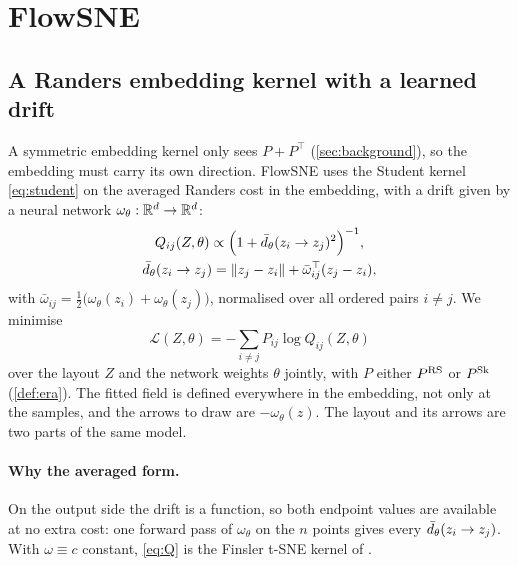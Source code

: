 \section{FlowSNE}
\label{sec:flowsne}

\subsection{A Randers embedding kernel with a learned drift}
\label{sec:kernel}

A symmetric embedding kernel only sees $P+P^\top$ (\cref{sec:background}),
so the embedding must carry its own direction. FlowSNE uses the Student
kernel \eqref{eq:student} on the averaged Randers cost in the embedding,
with a drift given by a neural network $\omega_\theta:\mathbb{R}^d\to\mathbb{R}^d$:
\begin{gather}
  Q_{ij}(Z,\theta)\propto\Big(1+\bar d_\theta(z_i\to z_j)^2\Big)^{-1},
  \label{eq:Q}\\
  \bar d_\theta(z_i\to z_j)=\|z_j-z_i\|+\bar\omega_{ij}^\top(z_j-z_i),
  \nonumber
\end{gather}
with $\bar\omega_{ij}=\tfrac12\big(\omega_\theta(z_i)+\omega_\theta(z_j)\big)$,
normalised over all ordered pairs $i\neq j$. We minimise
\begin{equation}
  \mathcal{L}(Z,\theta)=-\sum_{i\neq j}P_{ij}\log Q_{ij}(Z,\theta)
  \label{eq:loss}
\end{equation}
over the layout $Z$ and the network weights $\theta$ jointly, with $P$
either $P^{\operatorname{RS}}$ or $P^{\operatorname{Sk}}$ (\cref{def:era}). The fitted field is
defined everywhere in the embedding, not only at the samples, and the
arrows to draw are $-\omega_\theta(z)$. The layout and its arrows are
two parts of the same model.

\paragraph{Why the averaged form.}
On the output side the drift is a function, so both endpoint values are
available at no extra cost: one forward pass of $\omega_\theta$ on the
$n$ points gives every $\bar d_\theta(z_i\to z_j)$. With $\omega\equiv c$
constant, \eqref{eq:Q} is the Finsler t-SNE kernel of
\citet{dages2026harnessing}.

